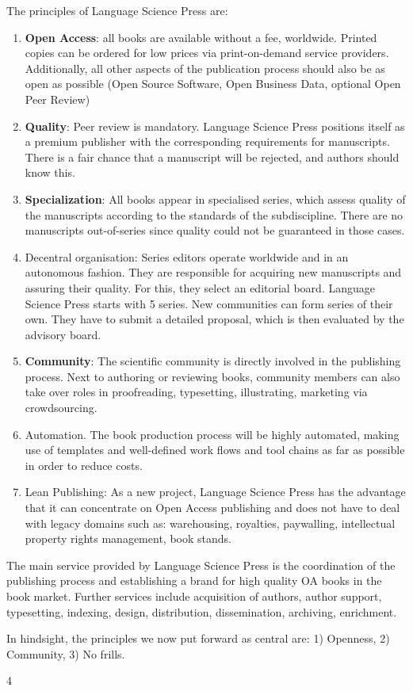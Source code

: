 \documentclass[output=guidelines,nonflat,smallfont,
draftmode
]{langsci/langscibook}
\newcommand{\evaluation}[1]{
  \renewcommand{\tblslinecolour}{lsLightOrange}
  \tblssy{receipt}{Evaluation}{\vspace*{-5mm}#1}
}
\newcommand{\othersolutions}[1]{
  \renewcommand{\tblslinecolour}{lsDarkGreenOne}
  \tblssy{more}{Other solutions}{\vspace*{-5mm}#1}
}
\renewcommand{\tblssy}[4][black!12]{%
  \renewcommand{\langscisymbol}{#2}\renewcommand{\tblsboxcolor}{#1}
  \begin{mdframed}[style=yellowexercise,frametitle={#3}]
    #4
  \end{mdframed}
}
\begin{document}
{The principles of Language Science Press are: 
\begin{enumerate}
 \item \textbf{Open Access}: all books are available without a fee, worldwide. Printed copies can be ordered for low prices via print-on-demand service providers. Additionally, all other aspects of the publication process should also be as open as possible (Open Source Software, Open Business Data, optional Open Peer Review)
 \item \textbf{Quality}: Peer review is mandatory. Language Science Press positions itself as a premium publisher with the corresponding requirements for manuscripts. There is a fair chance that a manuscript will be rejected, and authors should know this. 
 \item \textbf{Specialization}: All books appear in specialised series, which assess quality of the manuscripts according to the standards of the subdiscipline. There are no manuscripts out-of-series since quality could not be guaranteed in those cases. 
 \item Decentral organisation: Series editors operate worldwide and in an autonomous fashion. They are responsible for acquiring new manuscripts and assuring their quality. For this, they select an editorial board. Language Science Press starts with 5 series. New communities can form series of their own. They have to submit a detailed proposal, which is then evaluated by the advisory board. 
 \item \textbf{Community}: The scientific community is directly involved in the publishing process. Next to authoring or reviewing books, community members can also take over roles in proofreading, typesetting, illustrating, marketing via crowdsourcing. 
 \item Automation. The book production process will be highly automated, making use of templates and well-defined work flows and tool chains as far as possible in order to reduce costs.  
 \item Lean Publishing: As a new project, Language Science Press has the advantage that it can concentrate on Open Access publishing and does not have to deal with legacy domains such as: warehousing, royalties, paywalling, intellectual property rights management, book stands. 
\end{enumerate}

The main service provided by Language Science Press is the coordination of the publishing process and establishing a brand for high quality OA books in the book market. Further services include acquisition of authors, author support, typesetting, indexing, design, distribution, dissemination, archiving, enrichment. 
}
\evaluation{In hindsight, the principles we now put forward as central are: 1) Openness, 2) Community, 3) No frills.}
\othersolutions{4%
}
\end{document}

